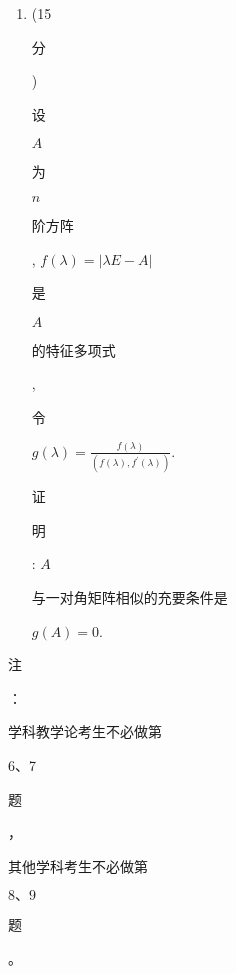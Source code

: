 \documentclass[10pt]{article}
\begin{document}
\begin{enumerate}
  \item (15 \begin{CJK}{UTF8}{mj}分\end{CJK}) \begin{CJK}{UTF8}{mj}设\end{CJK} $A$ \begin{CJK}{UTF8}{mj}为\end{CJK} $n$ \begin{CJK}{UTF8}{mj}阶方阵\end{CJK}, $f(\lambda)=|\lambda E-A|$ \begin{CJK}{UTF8}{mj}是\end{CJK} $A$ \begin{CJK}{UTF8}{mj}的特征多项式\end{CJK}, \begin{CJK}{UTF8}{mj}令\end{CJK} $g(\lambda)=\frac{f(\lambda)}{\left(f(\lambda), f^{\prime}(\lambda)\right)}$. \begin{CJK}{UTF8}{mj}证\end{CJK} \begin{CJK}{UTF8}{mj}明\end{CJK}: $A$ \begin{CJK}{UTF8}{mj}与一对角矩阵相似的充要条件是\end{CJK} $g(A)=0$.

\end{enumerate}
\begin{CJK}{UTF8}{mj}注\end{CJK}：\begin{CJK}{UTF8}{mj}学科教学论考生不必做第\end{CJK} 6、7 \begin{CJK}{UTF8}{mj}题\end{CJK}，\begin{CJK}{UTF8}{mj}其他学科考生不必做第\end{CJK} $8 、 9$ \begin{CJK}{UTF8}{mj}题\end{CJK}。
\end{document}
